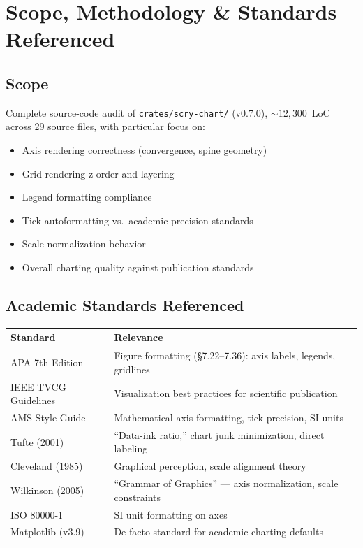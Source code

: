 \documentclass[11pt,a4paper]{article}
\begin{document}
\tableofcontents
\newpage

\section{Scope, Methodology \& Standards Referenced}

\subsection{Scope}
Complete source-code audit of \texttt{crates/scry-chart/} (v0.7.0),
${\sim}12{,}300$~LoC across 29 source files, with particular focus on:
\begin{itemize}[nosep]
  \item Axis rendering correctness (convergence, spine geometry)
  \item Grid rendering z-order and layering
  \item Legend formatting compliance
  \item Tick autoformatting vs.\ academic precision standards
  \item Scale normalization behavior
  \item Overall charting quality against publication standards
\end{itemize}

\subsection{Academic Standards Referenced}

\begin{longtable}{l p{10cm}}
\toprule
\textbf{Standard} & \textbf{Relevance} \\
\midrule
APA 7th Edition & Figure formatting (§7.22--7.36): axis labels, legends, gridlines \\
IEEE TVCG Guidelines & Visualization best practices for scientific publication \\
AMS Style Guide & Mathematical axis formatting, tick precision, SI units \\
Tufte (2001) & ``Data-ink ratio,'' chart junk minimization, direct labeling \\
Cleveland (1985) & Graphical perception, scale alignment theory \\
Wilkinson (2005) & ``Grammar of Graphics'' — axis normalization, scale constraints \\
ISO 80000-1 & SI unit formatting on axes \\
Matplotlib (v3.9) & De facto standard for academic charting defaults \\
\bottomrule
\end{longtable}
\end{document}
